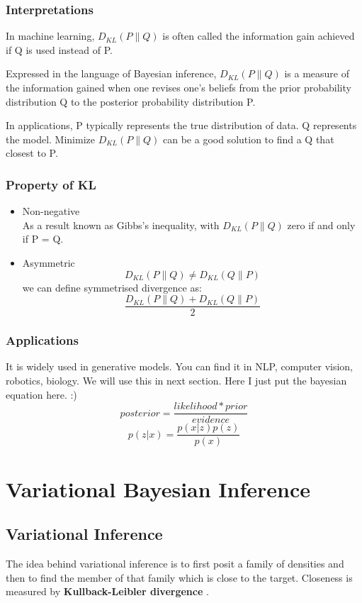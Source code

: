 \documentclass{article}
\begin{document}
\subsubsection{Interpretations}
In machine learning, $D_{KL}(P \parallel Q)$ is often called the information gain achieved if Q is used instead of P.

Expressed in the language of Bayesian inference, $D_{KL}(P \parallel Q)$ is a measure of the information gained when one revises one's beliefs from the prior probability distribution Q to the posterior probability distribution P.

In applications, P typically represents the true distribution of data. Q represents the model. Minimize $D_{KL}(P \parallel Q)$ can be a good solution to find a Q that closest to P.  
\subsubsection{Property of KL}
\begin{itemize}
\item Non-negative \\
As a result known as Gibbs's inequality, with $D_{KL}(P \parallel Q)$ zero if and only if P = Q.
\item Asymmetric
$$D_{KL}(P \parallel Q) \neq D_{KL}(Q \parallel P)$$
we can define symmetrised divergence as:
$$\frac{D_{KL}(P \parallel Q) + D_{KL}(Q \parallel P)}{2}$$
\end{itemize}
\subsubsection{Applications}
It is widely used in generative models. You can find it in NLP, computer vision, robotics, biology. We will use this in next section. Here I just put the bayesian equation here. :)
$$posterior=\frac{likelihood * prior}{evidence}$$
$$p(z|x)=\frac{p(x|z)p(z)}{p(x)}$$

\section{Variational Bayesian Inference}
\subsection{Variational Inference}
The idea behind variational inference is to first posit a family of densities and then to find the member of that family which is close to the target. Closeness is measured by \textbf{Kullback-Leibler divergence} .
\end{document}
